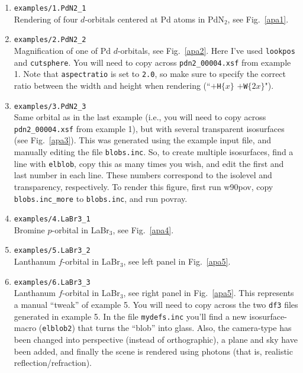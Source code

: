 \documentclass[
  notitlepage,
  twoside,
   prb,
  floatfix,
]{revtex4-1}
\newcommand{\fig}[1]{Fig.~\ref{#1}}
\begin{document}
\begin{enumerate}
\item {\tt examples/1.PdN2\_1} \\
Rendering of four $d$-orbitals centered at Pd atoms in PdN$_2$, see \fig{apa1}.

\item {\tt examples/2.PdN2\_2} \\
Magnification of one of Pd $d$-orbitals, see \fig{apa2}. Here I've used {\tt lookpos} and {\tt cutsphere}. You will need to copy across {\tt pdn2\_00004.xsf} from example 1. Note that {\tt aspectratio} is set to {\tt 2.0}, so make sure to specify the correct ratio between the width and height when rendering (``$+${\tt H}$\{x\}$ $+${\tt W}$\{2x\}$"). 

\item {\tt examples/3.PdN2\_3} \\
Same orbital as in the last example (i.e., you will need to copy across {\tt pdn2\_00004.xsf} from example 1), but with several transparent isosurfaces (see \fig{apa3}). This was generated using the example input file, and manually editing the file {\tt blobs.inc}. So, to create multiple isosurfaces, find a line with {\tt elblob}, copy this as many times you wish, and edit the first and last number in each line. These numbers correspond to the isolevel and transparency, respectively. To render this figure, first run \textsf{w90pov}, copy {\tt blobs.inc\_more} to {\tt blobs.inc}, and run \textsf{povray}.

\item {\tt examples/4.LaBr3\_1} \\
Bromine $p$-orbital in LaBr$_3$, see \fig{apa4}.

\item {\tt examples/5.LaBr3\_2} \\
Lanthanum $f$-orbital in LaBr$_3$, see left panel in \fig{apa5}.
\item {\tt examples/6.LaBr3\_3} \\
Lanthanum $f$-orbital in LaBr$_3$, see right panel in \fig{apa5}. This represents a manual ``tweak'' of example 5. You will need to copy across the two {\tt df3} files generated in example 5. In the file {\tt mydefs.inc} you'll find a new isosurface-macro ({\tt elblob2}) that turns the ``blob'' into glass. Also, the camera-type has been changed into perspective (instead of orthographic), a plane and sky have been added, and finally the scene is rendered using photons (that is, realistic reflection/refraction). 
\end{enumerate}
\end{document}
